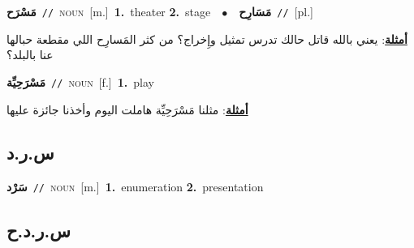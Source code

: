 \documentclass[10pt,a4paper,twoside]{article} %
\begin{document}
\begin{multicols}{2}
{\setlength\topsep{0pt}\textbf{\foreignlanguage{arabic}{مَسْرَح}}\ {\color{gray}\texttt{//}\color{black}}\ \textsc{noun}\ [m.]\ \textbf{1.}~theater  \textbf{2.}~stage\ \ $\bullet$\ \ \setlength\topsep{0pt}\textbf{\foreignlanguage{arabic}{مَسَارِح}}\ {\color{gray}\texttt{//}\color{black}}\ [pl.]\  \begin{flushright}\color{gray}\foreignlanguage{arabic}{\textbf{\underline{\foreignlanguage{arabic}{أمثلة}}}: يعني بالله قاتل حالك تدرس تمثيل وإِخراج؟ من كثر المَسارِح اللي مقطعة حبالها عنا بالبلد؟}\end{flushright}\color{black}} \vspace{2mm}

{\setlength\topsep{0pt}\textbf{\foreignlanguage{arabic}{مَسْرَحِيِّة}}\ {\color{gray}\texttt{//}\color{black}}\ \textsc{noun}\ [f.]\ \textbf{1.}~play\  \begin{flushright}\color{gray}\foreignlanguage{arabic}{\textbf{\underline{\foreignlanguage{arabic}{أمثلة}}}: مثلنا مَسْرَحِيِّة هاملت اليوم وأخذنا جائزة عليها}\end{flushright}\color{black}} \vspace{2mm}

\vspace{-3mm}
\subsection*{\color{blue}\foreignlanguage{arabic}{س.ر.د}\color{blue}{}} 

{\setlength\topsep{0pt}\textbf{\foreignlanguage{arabic}{سَرْد}}\ {\color{gray}\texttt{//}\color{black}}\ \textsc{noun}\ [m.]\ \textbf{1.}~enumeration  \textbf{2.}~presentation\ } \vspace{2mm}

\vspace{-3mm}
\subsection*{\color{blue}\foreignlanguage{arabic}{س.ر.د.ح}\color{blue}{}} 


\end{multicols}
\end{document}
